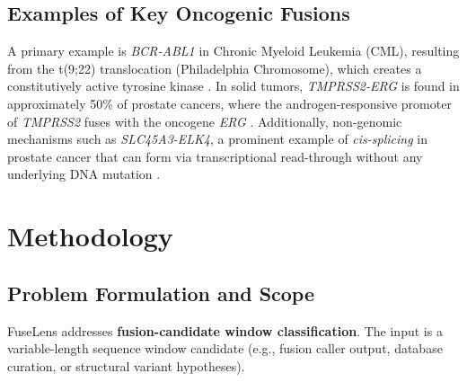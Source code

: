 \documentclass{bioinfo}
\begin{document}
\subsection{Examples of Key Oncogenic Fusions}
A primary example is \textit{BCR-ABL1} in Chronic Myeloid Leukemia (CML), resulting from the t(9;22) translocation (Philadelphia Chromosome), which creates a constitutively active tyrosine kinase \cite{bcr_abl}. In solid tumors, \textit{TMPRSS2-ERG} is found in approximately 50\% of prostate cancers, where the androgen-responsive promoter of \textit{TMPRSS2} fuses with the oncogene \textit{ERG} \cite{tmprss2_erg}. Additionally, non-genomic mechanisms such as \textit{SLC45A3-ELK4}, a prominent example of \textit{cis-splicing} in prostate cancer that can form via transcriptional read-through without any underlying DNA mutation \cite{slc45a3_elk4}.

\section{Methodology}

\subsection{Problem Formulation and Scope}
FuseLens addresses \textbf{fusion-candidate window classification}. The input is a variable-length sequence window candidate (e.g., fusion caller output, database curation, or structural variant hypotheses).
\end{document}
